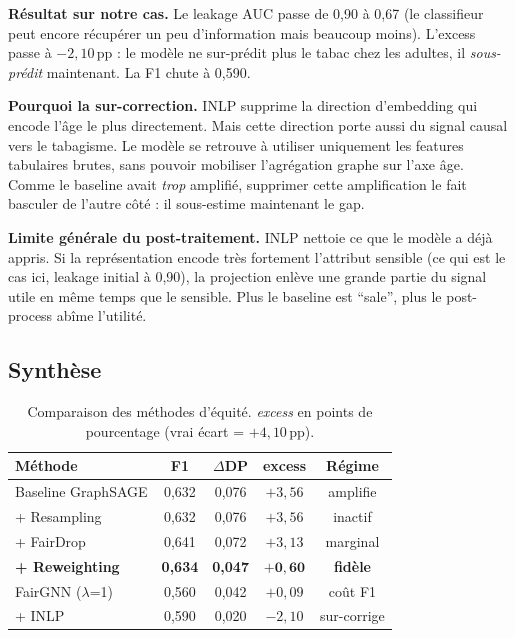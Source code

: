 \documentclass[10pt,a4paper,twocolumn]{article}
\begin{document}
\textbf{Résultat sur notre cas.} Le leakage AUC passe de 0{,}90 à 0{,}67 (le classifieur peut encore récupérer un peu d'information mais beaucoup moins). L'excess passe à $-2{,}10$\,pp : le modèle ne sur-prédit plus le tabac chez les adultes, il \emph{sous-prédit} maintenant. La F1 chute à 0{,}590.

\textbf{Pourquoi la sur-correction.} INLP supprime la direction d'embedding qui encode l'âge le plus directement. Mais cette direction porte aussi du signal causal vers le tabagisme. Le modèle se retrouve à utiliser uniquement les features tabulaires brutes, sans pouvoir mobiliser l'agrégation graphe sur l'axe âge. Comme le baseline avait \emph{trop} amplifié, supprimer cette amplification le fait basculer de l'autre côté : il sous-estime maintenant le gap.

\textbf{Limite générale du post-traitement.} INLP nettoie ce que le modèle a déjà appris. Si la représentation encode très fortement l'attribut sensible (ce qui est le cas ici, leakage initial à 0{,}90), la projection enlève une grande partie du signal utile en même temps que le sensible. Plus le baseline est ``sale'', plus le post-process abîme l'utilité.

\subsection{Synthèse}

\begin{table}[H]
\centering
\footnotesize
\begin{tabular}{lcccc}
\toprule
Méthode & F1 & $\Delta$DP & excess & Régime \\
\midrule
Baseline GraphSAGE & 0{,}632 & 0{,}076 & $+3{,}56$ & amplifie \\
+ Resampling & 0{,}632 & 0{,}076 & $+3{,}56$ & inactif \\
+ FairDrop & 0{,}641 & 0{,}072 & $+3{,}13$ & marginal \\
\textbf{+ Reweighting} & \textbf{0{,}634} & \textbf{0{,}047} & $\mathbf{+0{,}60}$ & \textbf{fidèle} \\
FairGNN ($\lambda$=1) & 0{,}560 & 0{,}042 & $+0{,}09$ & coût F1 \\
+ INLP & 0{,}590 & 0{,}020 & $-2{,}10$ & sur-corrige \\
\bottomrule
\end{tabular}
\caption{Comparaison des méthodes d'équité. \emph{excess} en points de pourcentage (vrai écart = $+4{,}10$\,pp).}
\end{table}
\end{document}
